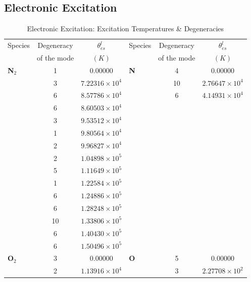 \subsection{Electronic Excitation}
\begin{table}[htp]
  \begin{center}
    \caption{Electronic Excitation:  Excitation Temperatures \& Degeneracies}
    \vspace{1em}
    \begin{tabular}{|l|cc||l|cc|} \hline
      Species  & Degeneracy  & $\theta^l_{es}$          & Species  & Degeneracy  & $\theta^l_{es}$ \\ 
               & of the mode & $\left(\unit{K}\right)$ &          & of the mode & $\left(\unit{K}\right)$ \\ \hline \hline
{\bf N$_2$} &        1  & $0.00000$              & {\bf N}  &	   4  & $0.00000$ \\
   &        3  & $7.22316\times 10^{4}$ &    &	  10  & $2.76647\times 10^{4}$ \\
   &        6  & $8.57786\times 10^{4}$ &    &	   6  & $4.14931\times 10^{4}$ \\
   &        6  & $8.60503\times 10^{4}$ &    &        & \\
   &        3  & $9.53512\times 10^{4}$ &    &        & \\
   &        1  & $9.80564\times 10^{4}$ &    &        & \\
   &        2  & $9.96827\times 10^{4}$ &    &        &  \\
   &        2  & $1.04898\times 10^{5}$ &    &        &  \\
   &        5  & $1.11649\times 10^{5}$ &    &        &  \\
   &        1  & $1.22584\times 10^{5}$ &    &        &  \\
   &        6  & $1.24886\times 10^{5}$ &    &        &  \\
   &        6  & $1.28248\times 10^{5}$ &    &        &  \\
   &       10  & $1.33806\times 10^{5}$ &    &        &  \\
   &        6  & $1.40430\times 10^{5}$ &    &        &  \\
   &        6  & $1.50496\times 10^{5}$ &    &        &  \\ \hline
{\bf O$_2$} &	   3  & $0.00000$              & {\bf O}  &	   5  & $0.00000$ \\
   &	   2  & $1.13916\times 10^{4}$   &   &	   3  & $2.27708\times 10^{2}$ \\

\end{tabular}
\end{center}
\end{table}

